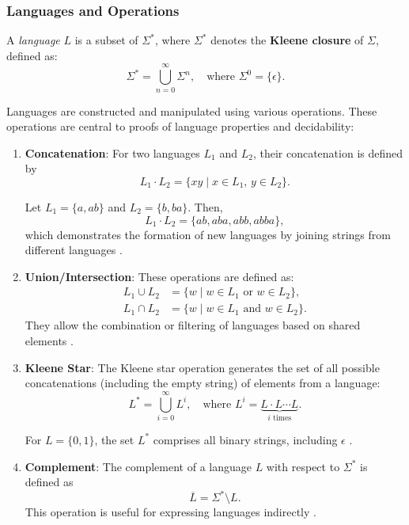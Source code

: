 \subsubsection{Languages and Operations}
A \textit{language} $L$ is a subset of $\Sigma^\ast$, where $\Sigma^\ast$ denotes the \textbf{Kleene closure} of $\Sigma$, defined as:
\[
\Sigma^\ast = \bigcup_{n=0}^\infty \Sigma^n, \quad \text{where } \Sigma^0 = \{\epsilon\}.
\]
\cite{kleene1956representation}

Languages are constructed and manipulated using various operations. These operations are central to proofs of language properties and decidability:

\begin{enumerate}
    \item \textbf{Concatenation}: For two languages $L_1$ and $L_2$, their concatenation is defined by 
    \[
    L_1 \cdot L_2 = \{xy \mid x \in L_1,\, y \in L_2\}.
    \]
    \begin{example}
    Let $L_1 = \{a, ab\}$ and $L_2 = \{b, ba\}$. Then,
    \[
    L_1 \cdot L_2 = \{ab, aba, abb, abba\},
    \]
    which demonstrates the formation of new languages by joining strings from different languages \cite{hopcroft2006introduction}.
    \end{example}

    \item \textbf{Union/Intersection}: These operations are defined as:
    \begin{align*}
        L_1 \cup L_2 &= \{w \mid w \in L_1 \text{ or } w \in L_2\}, \\
        L_1 \cap L_2 &= \{w \mid w \in L_1 \text{ and } w \in L_2\}.
    \end{align*}
    They allow the combination or filtering of languages based on shared elements \cite{hopcroft2006introduction}.

    \item \textbf{Kleene Star}: The Kleene star operation generates the set of all possible concatenations (including the empty string) of elements from a language:
    \[
    L^\ast = \bigcup_{i=0}^\infty L^i, \quad \text{where } L^i = \underbrace{L \cdot L \cdots L}_{i \text{ times}}.
    \]
    \begin{example}
    For $L = \{0, 1\}$, the set $L^\ast$ comprises all binary strings, including $\epsilon$ \cite{hopcroft2006introduction}.
    \end{example}

    \item \textbf{Complement}: The complement of a language $L$ with respect to $\Sigma^\ast$ is defined as 
    \[
    \overline{L} = \Sigma^\ast \setminus L.
    \]
    This operation is useful for expressing languages indirectly \cite{hopcroft2006introduction}.


\end{enumerate}
